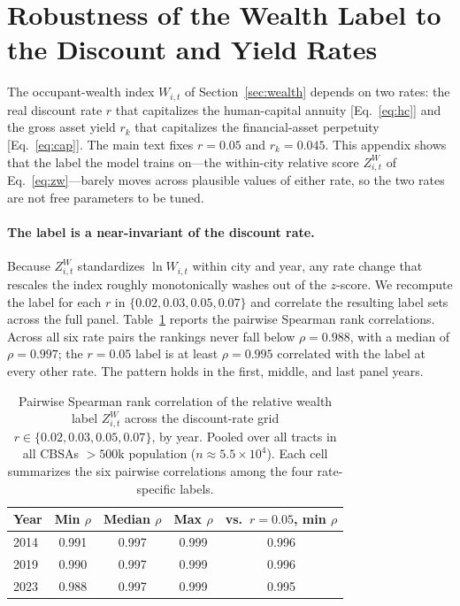 
\section{Robustness of the Wealth Label to the Discount and Yield Rates}
\label{app:label-robustness}

The occupant-wealth index $W_{i,t}$ of Section~\ref{sec:wealth} depends on two rates: the
real discount rate $r$ that capitalizes the human-capital annuity [Eq.~\eqref{eq:hc}] and the
gross asset yield $r_k$ that capitalizes the financial-asset perpetuity [Eq.~\eqref{eq:cap}].
The main text fixes $r=0.05$ and $r_k=0.045$. This appendix shows that the label the model
trains on---the within-city relative score $Z^{W}_{i,t}$ of Eq.~\eqref{eq:zw}---barely moves
across plausible values of either rate, so the two rates are not free parameters to be tuned.

\paragraph{The label is a near-invariant of the discount rate.}
Because $Z^{W}_{i,t}$ standardizes $\ln W_{i,t}$ within city and year, any rate change that
rescales the index roughly monotonically washes out of the $z$-score. We recompute the label
for each $r$ in $\{0.02, 0.03, 0.05, 0.07\}$ and correlate the resulting label sets across the
full panel. Table~\ref{tab:rate-robust} reports the pairwise Spearman rank correlations.
Across all six rate pairs the rankings never fall below $\rho = 0.988$, with a median of
$\rho = 0.997$; the $r=0.05$ label is at least $\rho = 0.995$ correlated with the label at
every other rate. The pattern holds in the first, middle, and last panel years.

\begin{table}[ht]
\centering
\caption{Pairwise Spearman rank correlation of the relative wealth label $Z^{W}_{i,t}$ across
the discount-rate grid $r\in\{0.02,0.03,0.05,0.07\}$, by year. Pooled over all tracts in all
CBSAs $>500$k population ($n\approx 5.5\times10^{4}$). Each cell summarizes the six pairwise
correlations among the four rate-specific labels.}
\label{tab:rate-robust}
\begin{tabular}{lcccc}
\toprule
Year & Min $\rho$ & Median $\rho$ & Max $\rho$ & vs.\ $r=0.05$, min $\rho$ \\
\midrule
2014 & 0.991 & 0.997 & 0.999 & 0.996 \\
2019 & 0.990 & 0.997 & 0.999 & 0.996 \\
2023 & 0.988 & 0.997 & 0.999 & 0.995 \\
\bottomrule
\end{tabular}
\end{table}

